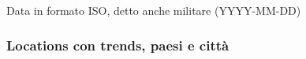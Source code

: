 \documentclass[xcolor=svgnames, aspectratio=169]{beamer}
\begin{document}
\begin{frame}{Data in formato ISO, detto anche militare (YYYY-MM-DD)}
    \begin{figure}[H]
        \centering
        \noindent{}
    \end{figure}
\end{frame}


\subsubsection{Locations con trends, paesi e città}
\end{document}
